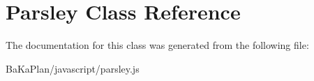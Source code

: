 \hypertarget{classParsley}{\section{Parsley Class Reference}
\label{classParsley}
}


The documentation for this class was generated from the following file\-:\begin{DoxyCompactItemize}
\item 
Ba\-Ka\-Plan/javascript/parsley.\-js\end{DoxyCompactItemize}
